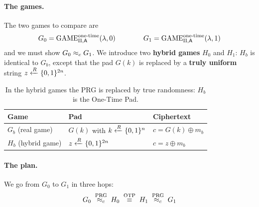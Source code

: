 \paragraph{The games.} The two games to compare are
\[
  G_0 = \mathrm{GAME}^{\text{one-time}}_{\Pi,\mathsf{A}}(\lambda, 0) \qquad\qquad G_1 = \mathrm{GAME}^{\text{one-time}}_{\Pi,\mathsf{A}}(\lambda, 1)
\]
and we must show $G_0 \approx_c G_1$. We introduce two \textbf{hybrid games} $H_0$ and $H_1$: $H_b$ is identical to $G_b$, except that the pad $G(k)$ is replaced by a \textbf{truly uniform} string $z \xleftarrow{R} \{0,1\}^{2n}$.

\begin{table}[H]
  \centering
  \small
  \begin{tabular}{@{}lll@{}}
    \toprule
    \textbf{Game} & \textbf{Pad} & \textbf{Ciphertext} \\
    \midrule
    $G_b$ (real game) & $G(k)$ with $k \xleftarrow{R} \{0,1\}^n$ & $c = G(k) \oplus m_b$ \\
    $H_b$ (hybrid game) & $z \xleftarrow{R} \{0,1\}^{2n}$ & $c = z \oplus m_b$ \\
    \bottomrule
  \end{tabular}
  \caption{In the hybrid games the PRG is replaced by true randomness: $H_b$ is the One-Time Pad.}
\end{table}

\paragraph{The plan.} We go from $G_0$ to $G_1$ in three hops:
\[
  G_0 \;\overset{\text{PRG}}{\approx_c}\; H_0 \;\overset{\text{OTP}}{\equiv}\; H_1 \;\overset{\text{PRG}}{\approx_c}\; G_1
\]

